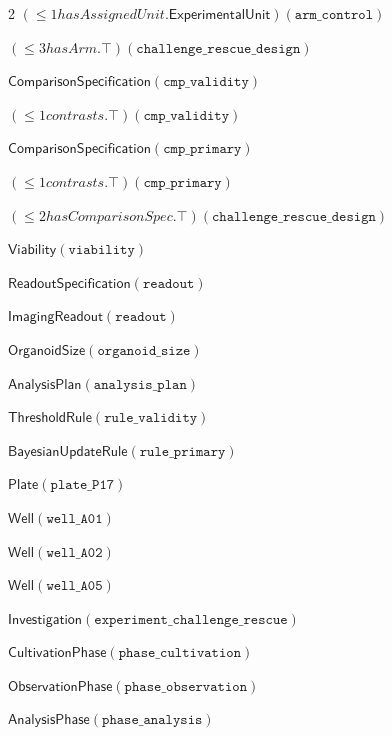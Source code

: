 \documentclass[10pt,a4paper]{article}
\begin{document}
{\begin{multicols}{2}
$(≤1 \mathit{hasAssignedUnit}.\mathsf{ExperimentalUnit})(\mathtt{arm\_\allowbreak{}\allowbreak{}control})$\par
$(≤3 \mathit{hasArm}.⊤)(\mathtt{challenge\_\allowbreak{}\allowbreak{}rescue\_\allowbreak{}\allowbreak{}design})$\par
$\mathsf{ComparisonSpecification}(\mathtt{cmp\_\allowbreak{}\allowbreak{}validity})$\par
$(≤1 \mathit{contrasts}.⊤)(\mathtt{cmp\_\allowbreak{}\allowbreak{}validity})$\par
$\mathsf{ComparisonSpecification}(\mathtt{cmp\_\allowbreak{}\allowbreak{}primary})$\par
$(≤1 \mathit{contrasts}.⊤)(\mathtt{cmp\_\allowbreak{}\allowbreak{}primary})$\par
$(≤2 \mathit{hasComparisonSpec}.⊤)(\mathtt{challenge\_\allowbreak{}\allowbreak{}rescue\_\allowbreak{}\allowbreak{}design})$\par
$\mathsf{Viability}(\mathtt{viability})$\par
$\mathsf{ReadoutSpecification}(\mathtt{readout})$\par
$\mathsf{ImagingReadout}(\mathtt{readout})$\par
$\mathsf{OrganoidSize}(\mathtt{organoid\_\allowbreak{}\allowbreak{}size})$\par
$\mathsf{AnalysisPlan}(\mathtt{analysis\_\allowbreak{}\allowbreak{}plan})$\par
$\mathsf{ThresholdRule}(\mathtt{rule\_\allowbreak{}\allowbreak{}validity})$\par
$\mathsf{BayesianUpdateRule}(\mathtt{rule\_\allowbreak{}\allowbreak{}primary})$\par
$\mathsf{Plate}(\mathtt{plate\_\allowbreak{}\allowbreak{}P17})$\par
$\mathsf{Well}(\mathtt{well\_\allowbreak{}\allowbreak{}A01})$\par
$\mathsf{Well}(\mathtt{well\_\allowbreak{}\allowbreak{}A02})$\par
$\mathsf{Well}(\mathtt{well\_\allowbreak{}\allowbreak{}A05})$\par
$\mathsf{Investigation}(\mathtt{experiment\_\allowbreak{}\allowbreak{}challenge\_\allowbreak{}\allowbreak{}rescue})$\par
$\mathsf{CultivationPhase}(\mathtt{phase\_\allowbreak{}\allowbreak{}cultivation})$\par
$\mathsf{ObservationPhase}(\mathtt{phase\_\allowbreak{}\allowbreak{}observation})$\par
$\mathsf{AnalysisPhase}(\mathtt{phase\_\allowbreak{}\allowbreak{}analysis})$\par

\end{multicols}}
\end{document}
